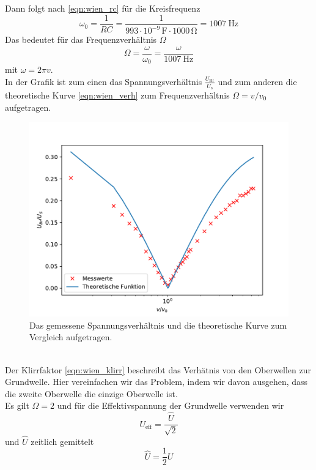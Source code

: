 Dann folgt nach \eqref{eqn:wien_rc} für die Kreisfrequenz
\begin{equation*}
  \omega_0 = \frac{1}{RC} = \frac{1}{993 \cdot 10^{-9}\, \si{\farad} \cdot 1000\, \si{\ohm}} = \SI{1007}{\hertz} 
\end{equation*}
Das bedeutet für das Frequenzverhältnis $\Omega$
\begin{equation*}
  \Omega = \frac{\omega}{\omega_0} = \frac{\omega}{\SI{1007}{\hertz}}
\end{equation*}
mit $\omega=2\pi v$.\\
In der Grafik ist zum einen das Spannungsverhältnis $\frac{U_\text{Br}}{U_\text{s}}$
und zum anderen die theoretische Kurve \eqref{eqn:wien_verh} zum Frequenzverhältnis $\Omega = v/v_0$ aufgetragen.
\begin{figure}
  \centering
  \includegraphics[width=\textwidth]{content/plot_e.pdf}
  \caption{Das gemessene Spannungsverhältnis und die theoretische Kurve zum Vergleich aufgetragen.}
  \label{fig:plot}
\end{figure}
\\
Der Klirrfaktor \eqref{eqn:wien_klirr} beschreibt das Verhätnis von den
Oberwellen zur Grundwelle. Hier vereinfachen wir das Problem, indem wir davon ausgehen, dass
die zweite Oberwelle die einzige Oberwelle ist.\\
Es gilt $\Omega = 2$ und für die Effektivspannung der Grundwelle verwenden wir
\begin{equation*}
  U_\text{eff} = \frac{\hat{U}}{\sqrt{2}}
\end{equation*}
und $\hat{U}$ zeitlich gemittelt
\begin{equation*}
  \hat{U} = \frac{1}{2} U
\end{equation*}
